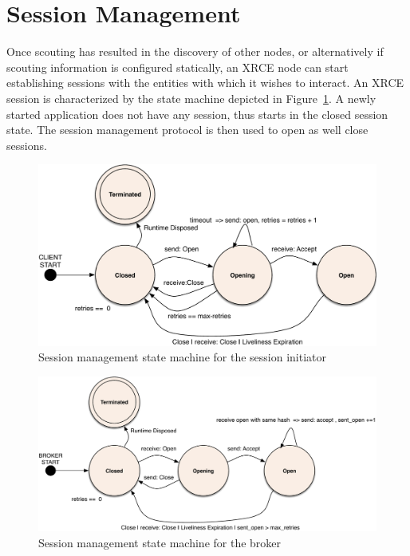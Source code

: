 \documentclass[a4paper,oneside,article]{memoir}
\begin{document}
\section{Session Management}

Once scouting has resulted in the discovery of other nodes, or alternatively if scouting information
is configured statically, an XRCE node can start establishing sessions with the entities with which
it wishes to interact.  An XRCE session is characterized by the state machine depicted in
Figure~\ref{fig:session-initiator}.  A newly started application does not have any session, thus
starts in the closed session state.  The session management protocol is then used to open as well
close sessions.

\begin{figure}
\centering
\includegraphics[scale=0.4]{session-initiator.pdf}
\caption{Session management state machine for the session initiator}\label{fig:session-initiator}
\end{figure}

\begin{figure}
\centering
\includegraphics[scale=0.4]{session-acceptor.pdf}
\caption{Session management state machine for the broker}\label{fig:session-acceptor}
\end{figure}
\end{document}
